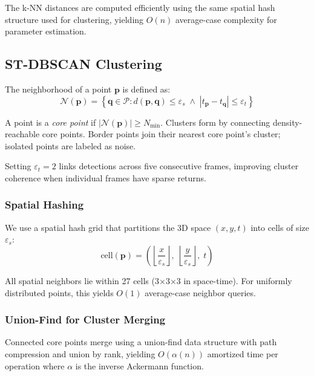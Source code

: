 \documentclass[conf]{new-aiaa}
\begin{document}
The k-NN distances are computed efficiently using the same spatial hash structure used for clustering, yielding $O(n)$ average-case complexity for parameter estimation.

\subsection{ST-DBSCAN Clustering}

The neighborhood of a point $\mathbf{p}$ is defined as:
\begin{equation}
\mathcal{N}(\mathbf{p}) = \left\{ \mathbf{q} \in \mathcal{P} : d(\mathbf{p}, \mathbf{q}) \leq \varepsilon_s \;\land\; |t_{\mathbf{p}} - t_{\mathbf{q}}| \leq \varepsilon_t \right\}
\end{equation}

A point is a \textit{core point} if $|\mathcal{N}(\mathbf{p})| \geq N_{\min}$. Clusters form by connecting density-reachable core points. Border points join their nearest core point's cluster; isolated points are labeled as noise.

Setting $\varepsilon_t = 2$ links detections across five consecutive frames, improving cluster coherence when individual frames have sparse returns.

\subsubsection{Spatial Hashing}

We use a spatial hash grid that partitions the 3D space $(x, y, t)$ into cells of size $\varepsilon_s$:
\begin{equation}
\text{cell}(\mathbf{p}) = \left( \left\lfloor \frac{x}{\varepsilon_s} \right\rfloor, \; \left\lfloor \frac{y}{\varepsilon_s} \right\rfloor, \; t \right)
\end{equation}

All spatial neighbors lie within 27 cells (3$\times$3$\times$3 in space-time). For uniformly distributed points, this yields $O(1)$ average-case neighbor queries.

\subsubsection{Union-Find for Cluster Merging}

Connected core points merge using a union-find data structure with path compression and union by rank, yielding $O(\alpha(n))$ amortized time per operation where $\alpha$ is the inverse Ackermann function.
\end{document}
